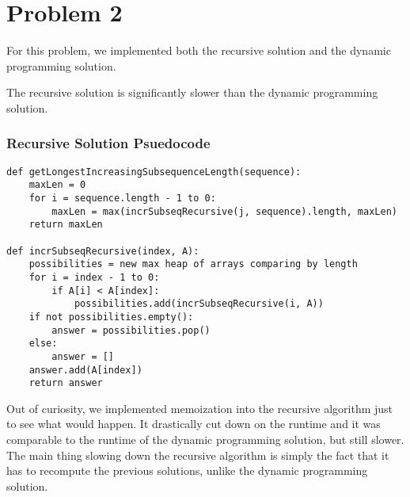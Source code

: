 \documentclass{math}
\begin{document}
\section*{Problem 2}
For this problem, we implemented both the recursive solution and the dynamic
programming solution.
\begin{center}
\end{center}
The recursive solution is significantly slower than the dynamic programming
solution.

\subsubsection*{Recursive Solution Psuedocode}
\begin{lstlisting}
def getLongestIncreasingSubsequenceLength(sequence):
    maxLen = 0
    for i = sequence.length - 1 to 0:
        maxLen = max(incrSubseqRecursive(j, sequence).length, maxLen)
    return maxLen

def incrSubseqRecursive(index, A):
    possibilities = new max heap of arrays comparing by length
    for i = index - 1 to 0:
        if A[i] < A[index]:
            possibilities.add(incrSubseqRecursive(i, A))
    if not possibilities.empty():
        answer = possibilities.pop()
    else:
        answer = []
    answer.add(A[index])
    return answer
\end{lstlisting}
Out of curiosity, we implemented memoization into the recursive algorithm just
to see what would happen. It drastically cut down on the runtime and it was
comparable to the runtime of the dynamic programming solution, but still slower.
The main thing slowing down the recursive algorithm is simply the fact that it
has to recompute the previous solutions, unlike the dynamic programming
solution.
\end{document}
